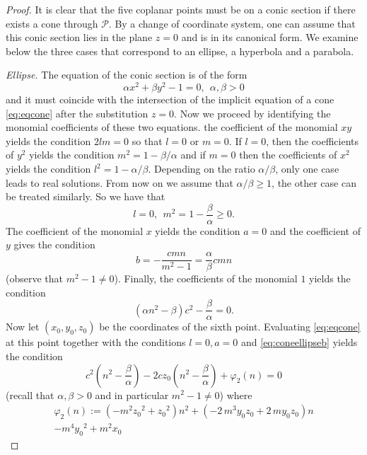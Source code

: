 \documentclass[5p]{elsarticle}
\newcommand\Pc{\mathcal P}
\newcommand{\com}[1]{{\color{black} #1}}
\newcommand{\lb}[1]{{\color{black} #1}}
\begin{document}
\begin{proof}It is clear that the five coplanar points must be on a conic section if there exists a cone through $\Pc$. By a change of coordinate system, one can assume that this conic section \com{lies in the plane} $z=0$ and is in its canonical form. We examine below the three cases that correspond to an ellipse, \com{a hyperbola} and a parabola. 

\medskip	
	
\noindent \textit{Ellipse.} The equation of the conic section is of the form 
$$\alpha x^2 + \beta y^2 -1 =0, \ \ \alpha,\beta > 0$$
and it must coincide with the intersection of the implicit equation of a cone \eqref{eq:eqcone} after the substitution $z=0$. \com{Now} we proceed by \lb{identifying} the monomial coefficients of these two equations. the coefficient of the monomial $xy$ yields the condition $2lm=0$ so that $l=0$ or $m=0$. If $l=0$, then the coefficients of $y^2$ yields the condition $m^2=1-\beta/\alpha$ and if $m=0$ then the coefficients of $x^2$ yields the condition $l^2=1-\alpha/\beta$. Depending on the ratio $\alpha/\beta$, only one case leads to real solutions. From now on we assume that $\alpha/\beta\geq 1$, the other case can be treated similarly. So we have that 
$$ l=0, \ \ m^2=1-\frac{\beta}{\alpha}\geq 0.$$
The coefficient of the monomial $x$ yields the condition $a=0$ and the coefficient of $y$ gives the condition
\begin{equation}\label{eq:coneellipseb}
b=-\frac{cmn}{m^2-1}=\frac{\alpha}{\beta}cmn	
\end{equation}
(observe that $m^2-1\neq 0$). 
Finally, the coefficients of the monomial $1$ yields the condition
\begin{equation}\label{eq:ellipseq1}
(\alpha n^2 - \beta) c^2 - \frac{\beta}{\alpha}=0.	
\end{equation}
\com{Now} let $(x_0,y_0,z_0)$ be the coordinates of the sixth point. \com{Evaluating} \eqref{eq:eqcone} at this point together with the conditions $l=0, a=0$ and \eqref{eq:coneellipseb} yields the condition 
\begin{equation}\label{eq:ellipseq2}
  {c}^{2}\left({n}^{2} -\frac{\beta}{\alpha} \right) -2cz_0 \left( 
   {n}^{2} -\frac{\beta}{\alpha}\right) + \varphi_2(n)=0	
\end{equation}
(recall that $\alpha,\beta >0$ and in particular $m^2-1\neq 0$) where
\begin{multline*}
\varphi_2(n):= 
  \left( -{m}^{2}{z_0}^{2}+{z_0}^{2} \right) {n
  }^{2} + \left( -2\,{m}^{3}y_0z_0+2\,my_0z_0 \right) n \\ -{m}^{4}{y_0}^{2}+{m}^{2}{x_0}

\end{multline*}
\end{proof}
\end{document}
